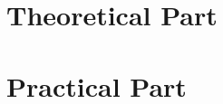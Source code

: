 \documentclass[12pt, oneside, a4paper]{book}
\begin{document}
\pagestyle{plain}





\part{Theoretical Part}










\part{Practical Part}















\listoffigures
\listoftables
\lstlistoflistings
\end{document}
